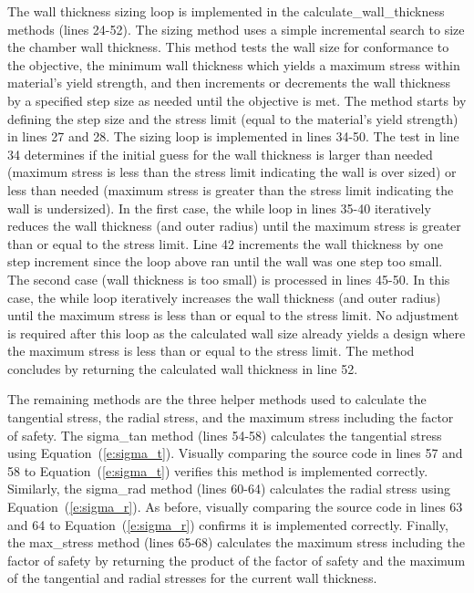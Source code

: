 \documentclass{article}
\begin{document}
\inputminted[linenos,frame=lines,framesep=2.0\fboxsep]{python}{pressure_vessel_calcs.py}

The wall thickness sizing loop is implemented in the calculate\_wall\_thickness methods (lines 24-52).  The sizing method uses a simple incremental search to size the chamber wall thickness.  This method tests the wall size for conformance to the objective, the minimum wall thickness which yields a maximum stress within material's yield strength, and then increments or decrements the wall thickness by a specified step size as needed until the objective is met.  The method starts by defining the step size and the stress limit (equal to the material's yield strength) in lines 27 and 28.  The sizing loop is implemented in lines 34-50.  The test in line 34 determines if the initial guess for the wall thickness is larger than needed (maximum stress is less than the stress limit indicating the wall is over sized) or less than needed (maximum stress is greater than the stress limit indicating the wall is undersized).  In the first case, the while loop in lines 35-40 iteratively reduces the wall thickness (and outer radius) until the maximum stress is greater than or equal to the stress limit.  Line 42 increments the wall thickness by one step increment since the loop above ran until the wall was one step too small.  The second case (wall thickness is too small) is processed in lines 45-50.  In this case, the while loop iteratively increases the wall thickness (and outer radius) until the maximum stress is less than or equal to the stress limit.  No adjustment is required after this loop as the calculated wall size already yields a design where the maximum stress is less than or equal to the stress limit.  The method concludes by returning the calculated wall thickness in line 52.

The remaining methods are the three helper methods used to calculate the tangential stress, the radial stress, and the maximum stress including the factor of safety.  The sigma\_tan method (lines 54-58) calculates the tangential stress using Equation~(\ref{e:sigma_t}).  Visually comparing the source code in lines 57 and 58 to Equation~(\ref{e:sigma_t}) verifies this method is implemented correctly.  Similarly, the sigma\_rad method (lines 60-64) calculates the radial stress using Equation~(\ref{e:sigma_r}).  As before, visually comparing the source code in lines 63 and 64 to Equation~(\ref{e:sigma_r}) confirms it is implemented correctly.  Finally, the max\_stress method (lines 65-68) calculates the maximum stress including the factor of safety by returning the product of the factor of safety and the maximum of the tangential and radial stresses for the current wall thickness.
\end{document}
